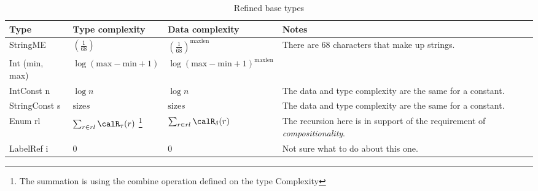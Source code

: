 \begin{longtable}{||l|l|l|l|}
\caption[Refined base types]{Refined base types}
\label{tab:v2RefinedBase}
\\\hline
\hline
Type & Type complexity & Data complexity & Notes \\\hline\hline

\textsf{StringME} &
    $\left(\frac{1}{68}\right)$ &
    $\left(\frac{1}{68}\right)^\mathrm{maxlen}$ &
\parbox[t]{5cm}{
There are 68 characters that make up strings.
\vspace{0.5mm}} \\\hline

\textsf{Int (min, max)} &
    $\log (\mathrm{max} - \mathrm{min} + 1)$ &
    $\log (\mathrm{max} - \mathrm{min} + 1)^\mathrm{maxlen}$ &
\parbox[t]{5cm}{
\vspace{0.5mm}} \\\hline

\textsf{IntConst n} & $\log n$ & $\log n$ &
\parbox[t]{5cm}{
The data and type complexity are the same for a constant.
\vspace{0.5mm}} \\\hline

\textsf{StringConst s} & $\mathrm{size} s$ & $\mathrm{size} s$ &
\parbox[t]{5cm}{
The data and type complexity are the same for a constant.
\vspace{0.5mm}} \\\hline

\textsf{Enum rl} &
$\sum_{r\in rl} \calR_\tau (r)$
\footnote{The summation is using the \textsf{combine} operation
defined on the type \textsf{Complexity}} &
$\sum_{r\in rl} \calR_\delta (r)$ &
\parbox[t]{5cm}{
The recursion here is in support of the requirement of
\textit{compositionality}.
\vspace{0.5mm}} \\\hline

\textsf{LabelRef i} & 0 & 0 &
\parbox[t]{5cm}{
Not sure what to do about this one.
\vspace{0.5mm}} \\\hline

\end{longtable}

